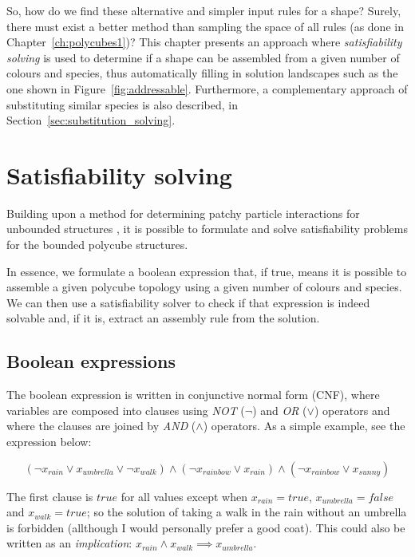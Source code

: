 So, how do we find these alternative and simpler input rules for a shape? Surely, there must exist a better method than sampling the space of all rules (as done in Chapter~\ref{ch:polycubes1})? This chapter presents an approach where \emph{satisfiability solving} is used to determine if a shape can be assembled from a given number of colours and species, thus automatically filling in solution landscapes such as the one shown in Figure~\ref{fig:addressable}. Furthermore, a complementary approach of substituting similar species is also described, in Section~\ref{sec:substitution_solving}.


\section{Satisfiability solving}

Building upon a method for determining patchy particle interactions for unbounded structures \cite{romano2020designing}, it is possible to formulate and solve satisfiability problems for the bounded polycube structures.

In essence, we formulate a boolean expression that, if true, means it is possible to assemble a given polycube topology using a given number of colours and species. We can then use a satisfiability solver to check if that expression is indeed solvable and, if it is, extract an assembly rule from the solution.

\subsection{Boolean expressions}

The boolean expression is written in conjunctive normal form (CNF), where variables are composed into clauses using \emph{NOT} (\(\lnot\)) and \emph{OR} (\(\lor\)) operators and where the clauses are joined by \emph{AND} (\(\land\)) operators. As a simple example, see the expression below:

\[
    (\lnot x_{rain} \lor x_{umbrella} \lor  \lnot x_{walk}) \land
    (\lnot x_{rainbow} \lor x_{rain}) \land
    (\lnot x_{rainbow} \lor x_{sunny})
\]

The first clause is \({true}\) for all values except when \(x_{rain}={true}\), \(x_{umbrella}={false}\) and \(x_{walk}=true\); so the solution of taking a walk in the rain without an umbrella is forbidden (allthough I would personally prefer a good coat). This could also be written as an \emph{implication}: \(x_{rain} \land x_{walk} \implies x_{umbrella}\).

